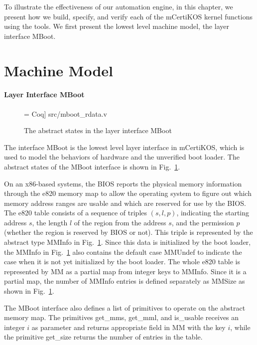 To illustrate the effectiveness of our automation engine, in this chapter, we present
how we build, specify, and verify each of the mCertiKOS kernel functions using the tools.
We first present the lowest level machine model, the layer interface MBoot.

\section{Machine Model}
\paragraph{Layer Interface MBoot}

\begin{figure}
 = Coq] {src/mboot_rdata.v}
\caption{The abstract states in the layer interface MBoot}
\label{fig:ref:mboot_rdata}
\end{figure}

The interface MBoot is the lowest level layer interface in mCertiKOS, which is
used to model the behaviors of hardware and the unverified boot loader.
The abstract states of the MBoot interface is shown in Fig.~\ref{fig:ref:mboot_rdata}.

On an x86-based systems, the BIOS reports the physical memory information
through the \textsf{e820} memory map to allow the operating system to figure out
which memory address ranges are usable and which are reserved for use by the BIOS.
The \textsf{e820} table consists of a sequence of triples $(s, l, p)$, indicating
the starting address $s$, the length $l$ of the region from the address $s$, and
the permission $p$ (whether the region is reserved by BIOS or not). This triple
is represented by the abstract type \textsf{MMInfo} in Fig.~\ref{fig:ref:mboot_rdata}.
Since this data is initialized by the boot loader, the
\textsf{MMInfo} in Fig.~\ref{fig:ref:mboot_rdata} also contains the default case
\textsf{MMUndef} to indicate the case when it is not yet initialized by the boot loader.
The whole \textsf{e820} table is represented by \textsf{MM} as a partial map
from integer keys to \textsf{MMInfo}. Since it is a partial map, the number of
\textsf{MMInfo} entries is defined separately as \textsf{MMSize} as shown in
Fig.~\ref{fig:ref:mboot_rdata}.

The MBoot interface also defines a list of primitives to operate on the abstract
memory map. The primitives \textsf{get\_mms}, \textsf{get\_mml}, and \textsf{is\_usable}
receives an integer $i$ as parameter and returns appropriate field in \textsf{MM}
with the key $i$, while the primitive \textsf{get\_size} returns the number of
entries in the table.


